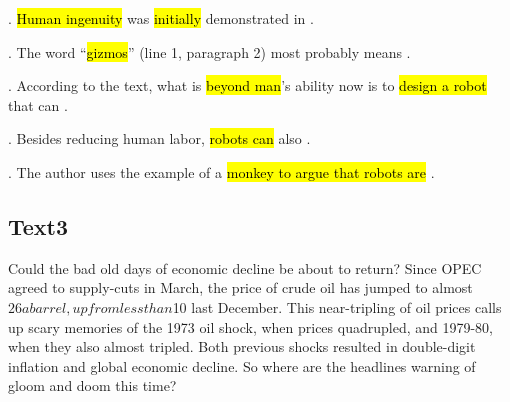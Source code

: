 \begin{questions} 
.	\hl{Human ingenuity} was \hl{initially} demonstrated in \ltk{}.\\

.	The word “\hl{gizmos}” (line 1, paragraph 2) most probably means \ltk{}.\\

.	According to the text, what is \hl{beyond man}’s ability now is to \hl{design a robot} that can \ltk{}.\\

.	Besides reducing human labor, \hl{robots can} also \ltk{}.\\

.	The author uses the example of a \hl{monkey to argue that robots are} \ltk{}.\\
\end{questions}

\subsection{Text3}
Could the bad old days of economic decline be about to return? Since OPEC agreed to supply-cuts in March, the price of crude oil has jumped to almost $26 a barrel, up from less than $10 last December. This near-tripling of oil prices calls up scary memories of the 1973 oil shock, when prices quadrupled, and 1979-80, when they also almost tripled. Both previous shocks resulted in double-digit inflation and global economic decline. So where are the headlines warning of gloom and doom this time?

